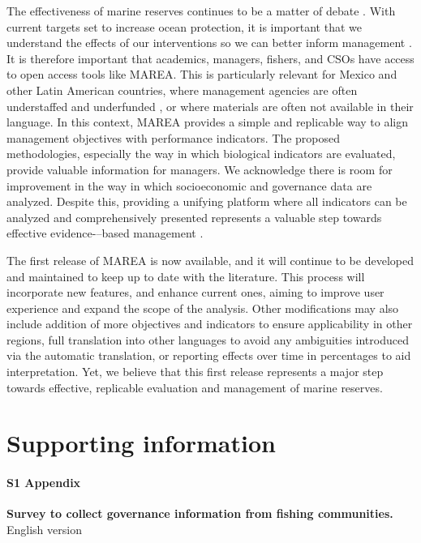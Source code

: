 \documentclass[10pt,letterpaper]{article}
\begin{document}
The effectiveness of marine reserves continues to be a matter of debate \cite{woodcock_2017-Wm,edgar_2014-UO,padleton_2017-vn}. With current targets set to increase ocean protection, it is important that we understand the effects of our interventions \cite{burgess_2018-HN} so we can better inform management \cite{ferraro_2006-oW}. It is therefore important that academics, managers, fishers, and CSOs have access to open access tools like MAREA. This is particularly relevant for Mexico and other Latin American countries, where management agencies are often understaffed and underfunded \cite{lundquist_2005-OL}, or where materials are often not available in their language. In this context, MAREA provides a simple and replicable way to align management objectives with performance indicators. The proposed methodologies, especially the way in which biological indicators are evaluated, provide valuable information for managers. We acknowledge there is room for improvement in the way in which socioeconomic and governance data are analyzed. Despite this, providing a unifying platform where all indicators can be analyzed and comprehensively presented represents a valuable step towards effective evidence-–based management \cite{ferraro_2006-oW}.

The first release of MAREA is now available, and it will continue to be developed and maintained to keep up to date with the literature. This process will incorporate new features, and enhance current ones, aiming to improve user experience and expand the scope of the analysis. Other modifications may also include addition of more objectives and indicators to ensure applicability in other regions, full translation into other languages to avoid any ambiguities introduced via the automatic translation, or reporting effects over time in percentages to aid interpretation. Yet, we believe that this first release represents a major step towards effective, replicable evaluation and management of marine reserves.

\section*{Supporting information}\label{supporting-information}

\paragraph*{S1 Appendix}
\label{S1_Appendix}
{\bf Survey to collect governance information from fishing communities.} English version
\end{document}
